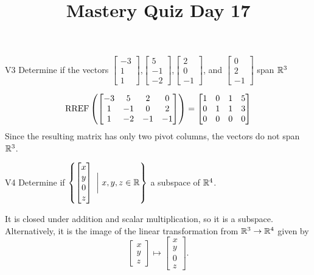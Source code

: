 \documentclass{sbgLAquiz}
\title{Mastery Quiz Day 17 }
\begin{document}
\begin{problem}{V3}
Determine if the vectors  $\begin{bmatrix} -3 \\ 1 \\ 1 \end{bmatrix}$,$\begin{bmatrix} 5 \\ -1 \\ -2 \end{bmatrix}$,$\begin{bmatrix}2 \\ 0 \\ -1 \end{bmatrix}$, and $\begin{bmatrix} 0 \\ 2 \\ -1\end{bmatrix}$ span $\mathbb{R}^3$
\end{problem}
\begin{solution}
$$\operatorname{RREF}\left(\begin{bmatrix}
-3 & 5 & 2 & 0 \\ 1 & -1 & 0 & 2 \\ 1 & -2 & -1 & -1 \end{bmatrix}\right)=\begin{bmatrix} 1 & 0 & 1 & 5 \\ 0 & 1 & 1 & 3 \\ 0 & 0 & 0 & 0\end{bmatrix}$$
Since the resulting matrix has only two pivot columns, the vectors do not span $\mathbb{R}^3$.
\end{solution}


\begin{problem}{V4}
Determine if $\left\{ \begin{bmatrix} x \\ y \\ 0 \\ z \end{bmatrix}\  \bigg|\ x,y,z \in \mathbb{R}\right\}$  a subspace of $\mathbb{R}^4$.
\end{problem}
\begin{solution}
It is closed under addition and scalar multiplication, so it is a subspace.  Alternatively, it is the image of the linear transformation from $\mathbb{R}^3 \rightarrow \mathbb{R}^4$ given by $$\begin{bmatrix} x \\ y \\ z \end{bmatrix} \mapsto  \begin{bmatrix} x \\ y \\ 0 \\ z \end{bmatrix}.$$
\end{solution}
\end{document}
